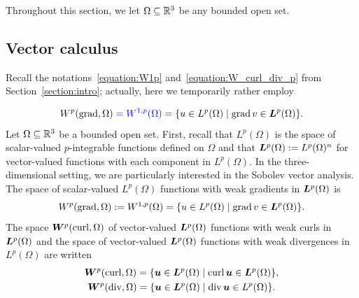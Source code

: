 \documentclass[10pt,a4paper]{article}
\newcommand\cye[1]{%
\protect\leavevmode
\begingroup
    \color{blue}%
    #1%
\endgroup
}
\newcommand{\mwl}[1]{{\color{red}#1}}
\begin{document}
Throughout this section, we let $\Omega \subseteq {\mathbb R}^{3}$ be any bounded open set.

\subsection{Vector calculus}

\cye{Recall the notations~\eqref{equation:W1p} and~\eqref{equation:W_curl_div_p} from Section~\ref{section:intro}; actually, here we temporarily rather employ }
\begin{gather*}
    W^{p}(\grad,\Omega) \cye{= W^{1,p}(\Omega)} = \{ u \in L^{p}(\Omega) \suchthat \grad v \in \bfL^{p}(\Omega) \}
    .
\end{gather*}
\mwl{Let $\Omega \subseteq {\mathbb R}^{3}$ be a bounded open set. 
First, recall that $L^{p}(\Omega)$ is the space of scalar-valued $p$-integrable functions defined on $\Omega$
and that $\bm{L}^{p}(\Omega) := L^{p}(\Omega)^{n}$ for vector-valued functions with each component in $L^{p}(\Omega)$. 
In the three-dimensional setting, we are particularly interested in the Sobolev vector analysis. 
The space of scalar-valued $L^{p}(\Omega)$ functions with weak gradients in $\bm{L}^{p}(\Omega)$ is 
\begin{gather*}
    W^{p}(\grad,\Omega) := W^{1,p}(\Omega) = \{ u \in L^{p}(\Omega) \suchthat \grad v \in \bfL^{p}(\Omega) \}
    .
\end{gather*}
The space $\bm{W}^{p}(\operatorname{curl},\Omega)$ of vector-valued $\bm{L}^{p}(\Omega)$ functions with weak curls in $\bm{L}^{p}(\Omega)$
and the space of vector-valued $\bm{L}^{p}(\Omega)$ functions with weak divergences in $L^{p}(\Omega)$ are written 
\begin{gather*}
    \bfW^{p}(\curl,\Omega) = \{ \bfu \in \bfL^{p}(\Omega) \suchthat \curl \bfu \in \bfL^{p}(\Omega) \},
    \\ 
    \bfW^{p}(\divergence,\Omega) = \{ \bfu \in \bfL^{p}(\Omega) \suchthat \divergence \bfu \in L^{p}(\Omega) \}.
\end{gather*}}
\end{document}
